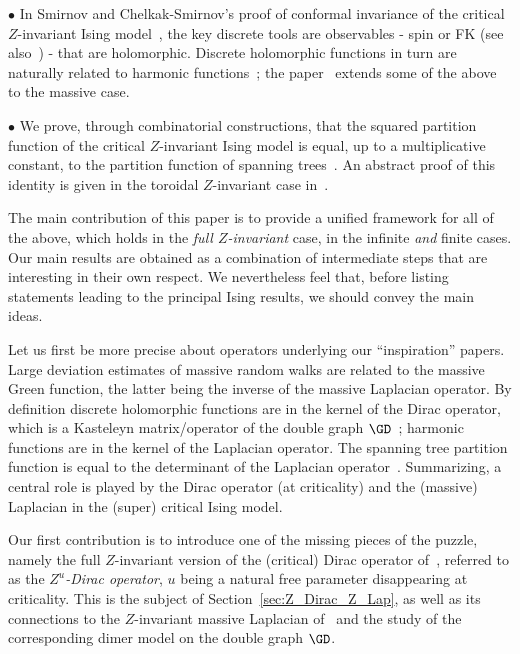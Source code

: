 \documentclass[a4paper,twoside,11pt]{article}
\begin{document}
$\bullet$
In Smirnov and Chelkak-Smirnov's proof of conformal invariance of the critical $Z$-invariant Ising 
model~\cite{Smirnov3,Smirnov2,ChelkakSmirnov:ising},
the key discrete tools are observables - spin or FK (see also~\cite{KadanoffCeva}) - that are holomorphic.
Discrete holomorphic functions in turn are naturally related to harmonic functions~\cite{Duffin,Mercat:ising,Kenyon3,
ChelkakSmirnov:toolbox}; 
the paper~\cite{MakarovSmirnov} extends some of the above to the massive case. 

$\bullet$ We prove, through combinatorial constructions,
that the squared partition function of the critical $Z$-invariant Ising model is equal, up to a multiplicative constant, to the partition function of spanning 
trees~\cite{deTiliere:mapping,deTiliere:partition}. An abstract proof of this identity is given in the toroidal $Z$-invariant case 
in~\cite{BoutillierdeTiliere:iso_gen,BdtR2}. 

The main contribution of this paper is to provide a unified framework for all of the above, which 
holds in the \emph{full $Z$-invariant} case, in the infinite \emph{and} finite cases. Our main results are obtained as a combination
of intermediate steps that are interesting in their own respect. We nevertheless feel that, before listing statements leading to the 
principal Ising results, we should convey the main ideas.

Let us first be more precise about operators underlying our ``inspiration'' papers. Large deviation estimates of 
massive random walks are related to the massive Green function, the latter being the inverse of the massive Laplacian operator. By definition 
discrete holomorphic functions are in the kernel of the Dirac operator, which is a Kasteleyn matrix/operator of the double graph $\GD$~\cite{Kenyon3}; 
harmonic functions are in the kernel of the Laplacian operator. The spanning tree partition function is equal to the determinant
of the Laplacian operator~\cite{Kirchhoff}. Summarizing, a central role is played by the Dirac operator (at criticality)
and the (massive) Laplacian in the (super) critical Ising model. 

Our first contribution is to introduce one of the missing pieces of the puzzle, namely the full $Z$-invariant version 
of the (critical) Dirac operator of~\cite{Kenyon3}, 
referred to as the \emph{$Z^u$-Dirac operator}, $u$ being a natural free parameter disappearing
at criticality. This is the subject of Section~\ref{sec:Z_Dirac_Z_Lap}, as well as its connections to the $Z$-invariant massive Laplacian 
of~\cite{BdTR1} and the study of the corresponding dimer model on the double graph $\GD$.
\end{document}
